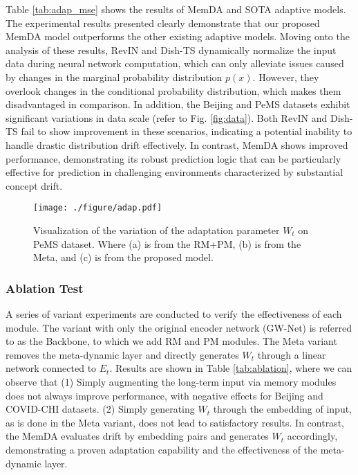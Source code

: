 \documentclass[sigconf]{acmart}
\begin{document}
Table \ref{tab:adap_mse} shows the results of MemDA and SOTA adaptive models. The experimental results presented clearly demonstrate that our proposed MemDA model outperforms the other existing adaptive models. Moving onto the analysis of these results, RevIN and Dish-TS dynamically normalize the input data during neural network computation, which can only alleviate issues caused by changes in the marginal probability distribution $p(x)$. However, they overlook changes in the conditional probability distribution, which makes them disadvantaged in comparison. In addition, the Beijing and PeMS datasets exhibit significant variations in data scale (refer to Fig. \ref{fig:data}). Both RevIN and Dish-TS fail to show improvement in these scenarios, indicating a potential inability to handle drastic distribution drift effectively. In contrast, MemDA shows improved performance, demonstrating its robust prediction logic that can be particularly effective for prediction in challenging environments characterized by substantial concept drift.

\begin{figure}[h]
	\centering
	\texttt{[image: ./figure/adap.pdf]}
	\caption{Visualization of the variation of the adaptation parameter $W_t$ on PeMS dataset. Where (a) is from the RM+PM, (b) is from the Meta, and (c) is from the proposed model.}
	\label{fig:adaptive}
\end{figure}

\subsubsection{Ablation Test}
A series of variant experiments are conducted to verify the effectiveness of each module. The variant with only the original encoder network (GW-Net) is referred to as the Backbone, to which we add RM and PM modules. The Meta variant removes the meta-dynamic layer and directly generates $W_t$ through a linear network connected to $E_t$. Results are shown in Table \ref{tab:ablation}, where we can observe that (1) Simply augmenting the long-term input via memory modules does not always improve performance, with negative effects for Beijing and COVID-CHI datasets. (2) Simply generating $W_t$ through the embedding of input, as is done in the Meta variant, does not lead to satisfactory results. In contrast, the MemDA evaluates drift by embedding pairs and generates $W_t$ accordingly, demonstrating a proven adaptation capability and the effectiveness of the meta-dynamic layer.
\end{document}
